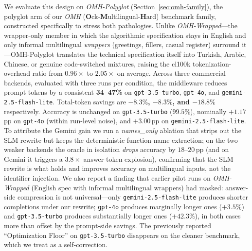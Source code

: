 \documentclass[11pt,a4paper,twocolumn]{article}
\begin{document}
We evaluate this design on \textit{OMH-Polyglot} (Section~\ref{sec:omh-family}), the polyglot arm of our \textit{OMH} (\textbf{O}ck-\textbf{M}ultilingual-\textbf{H}ard) benchmark family, constructed specifically to stress both pathologies. Unlike \textit{OMH-Wrapped}---the wrapper-only member in which the algorithmic specification stays in English and only informal multilingual \emph{wrappers} (greetings, fillers, casual register) surround it---OMH-Polyglot translates the technical specification itself into Turkish, Arabic, Chinese, or genuine code-switched mixtures, raising the cl100k tokenization-overhead ratio from $0.96\times$ to $2.05\times$ on average. Across three commercial backends, evaluated with three runs per condition, the middleware reduces prompt tokens by a consistent \textbf{34--47\%} on \texttt{gpt-3.5-turbo}, \texttt{gpt-4o}, and \texttt{gemini-2.5-flash-lite}. Total-token savings are \textbf{$-8.3\%$, $-8.3\%$, and $-18.8\%$} respectively. Accuracy is unchanged on \texttt{gpt-3.5-turbo} ($99.5\%$), nominally $+1.17$\,pp on \texttt{gpt-4o} (within run-level noise), and $+3.00$\,pp on \texttt{gemini-2.5-flash-lite}. To attribute the Gemini gain we run a \textit{names\_only} ablation that strips out the SLM rewrite but keeps the deterministic function-name extraction; on the two weaker backends the oracle in isolation \emph{drops} accuracy by $18$--$20$\,pp (and on Gemini it triggers a $3.8\times$ answer-token explosion), confirming that the SLM rewrite is what holds and improves accuracy on multilingual inputs, not the identifier injection. We also report a finding that earlier pilot runs on \textit{OMH-Wrapped} (English spec with informal multilingual wrappers) had masked: answer-side compression is not universal---only \texttt{gemini-2.5-flash-lite} produces shorter completions under our rewrite; \texttt{gpt-4o} produces marginally longer ones ($+3.5\%$) and \texttt{gpt-3.5-turbo} produces substantially longer ones ($+42.3\%$), in both cases more than offset by the prompt-side savings. The previously reported ``Optimization Floor'' on \texttt{gpt-3.5-turbo} disappears on the cleaner benchmark, which we treat as a self-correction.
\end{document}
